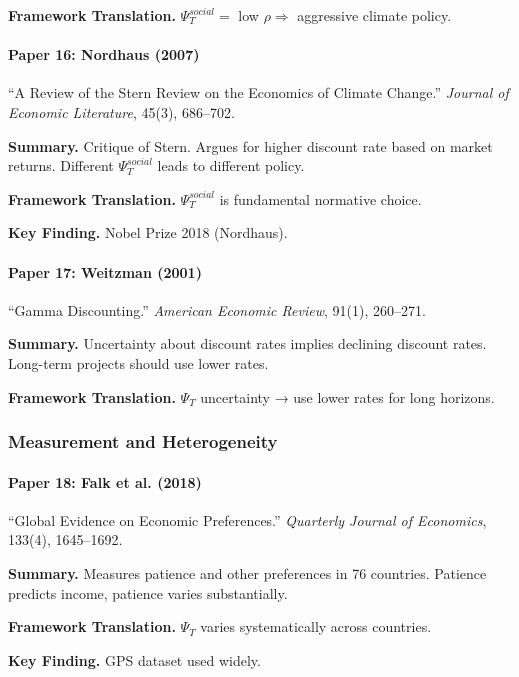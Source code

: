 \textbf{Framework Translation.}
$\Psi_T^{social} = $ low $\rho \Rightarrow$ aggressive climate policy.

\paragraph{Paper 16: Nordhaus (2007)}

``A Review of the Stern Review on the Economics of Climate Change.''
\textit{Journal of Economic Literature}, 45(3), 686--702.

\textbf{Summary.}
Critique of Stern. Argues for higher discount rate based on market returns.
Different $\Psi_T^{social}$ leads to different policy.

\textbf{Framework Translation.}
$\Psi_T^{social}$ is fundamental normative choice.

\textbf{Key Finding.}
Nobel Prize 2018 (Nordhaus).

\paragraph{Paper 17: Weitzman (2001)}

``Gamma Discounting.''
\textit{American Economic Review}, 91(1), 260--271.

\textbf{Summary.}
Uncertainty about discount rates implies declining discount rates.
Long-term projects should use lower rates.

\textbf{Framework Translation.}
$\Psi_T$ uncertainty → use lower rates for long horizons.

\subsubsection{Measurement and Heterogeneity}

\paragraph{Paper 18: Falk et al. (2018)}

``Global Evidence on Economic Preferences.''
\textit{Quarterly Journal of Economics}, 133(4), 1645--1692.

\textbf{Summary.}
Measures patience and other preferences in 76 countries.
Patience predicts income, patience varies substantially.

\textbf{Framework Translation.}
$\Psi_T$ varies systematically across countries.

\textbf{Key Finding.}
GPS dataset used widely.

